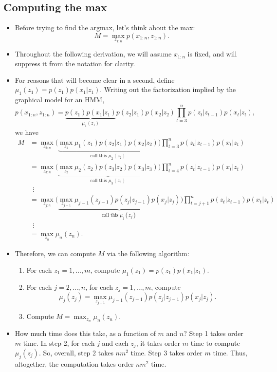 \documentclass[12pt]{article}
\begin{document}
\subsection{Computing the max}
\begin{itemize}
\item Before trying to find the argmax, let's think about the max:
$$ M = \max_{z_{1:n}} p(x_{1:n},z_{1:n}). $$
\item Throughout the following derivation, we will assume $x_{1:n}$ is fixed, and will suppress it from the notation for clarity. 
\item For reasons that will become clear in a second, define $\mu_1(z_1) = p(z_1) p(x_1 | z_1)$. Writing out the factorization implied by the graphical model for an HMM,
$$ p(x_{1:n},z_{1:n}) = \underbrace{p(z_1) p(x_1 | z_1)}_{\textstyle\mu_1(z_1)} p(z_2 | z_1) p(x_2 | z_2)
	 \prod_{t = 3}^n p(z_ t | z_{t -1}) p(x_t | z_t), $$
we have
\begin{align*}
M &= \max_{z_{2:n}} \Big(\underbrace{\max_{z_1} \mu_1(z_1) p(z_2 | z_1) p(x_2 | z_2)}_{\textstyle\text{call this } \mu_2(z_2)}\Big)
	 \prod_{t = 3}^n p(z_ t | z_{t -1}) p(x_t | z_t) \\
  &= \max_{z_{3:n}} \Big(\underbrace{\max_{z_2} \mu_2(z_2) p(z_3 | z_2) p(x_3 | z_3)}_{\textstyle\text{call this } \mu_3(z_3)}\Big)
  	 \prod_{t = 4}^n p(z_ t | z_{t -1}) p(x_t | z_t) \\
  &~~\vdots\\
  &= \max_{z_{j:n}} \Big(\underbrace{\max_{z_{j-1}} \mu_{j-1}(z_{j-1}) p(z_j | z_{j-1}) p(x_j | z_j)}_{\textstyle\text{call this } \mu_j(z_j)}\Big)
  	 \prod_{t = j+1}^n p(z_ t | z_{t -1}) p(x_t | z_t) \\
  &~~\vdots\\
  &= \max_{z_n} \mu_n(z_n).
\end{align*}
\item Therefore, we can compute $M$ via the following algorithm:
\begin{enumerate}
\item For each $z_1 = 1,\ldots,m$, compute $\mu_1(z_1) = p(z_1) p(x_1 | z_1)$.
\item For each $j = 2,\ldots,n$, for each $z_j = 1,\ldots,m$, compute
$$ \mu_j(z_j) = \max_{z_{j-1}} \mu_{j -1}(z_{j -1}) p(z_j | z_{j-1}) p(x_j | z_j). $$
\item Compute $M = \max_{z_n} \mu_n (z_n)$.
\end{enumerate}
\item How much time does this take, as a function of $m$ and $n$? Step 1 takes order $m$ time. In step 2, for each $j$ and each $z_j$, it takes order $m$ time to compute $\mu_j(z_j)$. So, overall, step 2 takes $n m^2$ time. Step 3 takes order $m$ time. Thus, altogether, the computation takes order $n m^2$ time.
\end{itemize}
\end{document}
